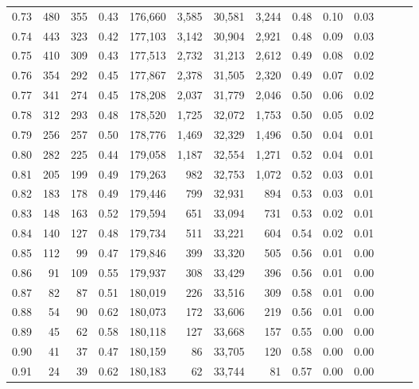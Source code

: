 \begin{tabular}{rrrrrrrrrrrrrr}
0.73 &    480 &    355 &  0.43 &  176,660 &    3,585 &  30,581 &   3,244 &  0.48 &  0.10 &      0.03 \\
0.74 &    443 &    323 &  0.42 &  177,103 &    3,142 &  30,904 &   2,921 &  0.48 &  0.09 &      0.03 \\
0.75 &    410 &    309 &  0.43 &  177,513 &    2,732 &  31,213 &   2,612 &  0.49 &  0.08 &      0.02 \\
0.76 &    354 &    292 &  0.45 &  177,867 &    2,378 &  31,505 &   2,320 &  0.49 &  0.07 &      0.02 \\
0.77 &    341 &    274 &  0.45 &  178,208 &    2,037 &  31,779 &   2,046 &  0.50 &  0.06 &      0.02 \\
0.78 &    312 &    293 &  0.48 &  178,520 &    1,725 &  32,072 &   1,753 &  0.50 &  0.05 &      0.02 \\
0.79 &    256 &    257 &  0.50 &  178,776 &    1,469 &  32,329 &   1,496 &  0.50 &  0.04 &      0.01 \\
0.80 &    282 &    225 &  0.44 &  179,058 &    1,187 &  32,554 &   1,271 &  0.52 &  0.04 &      0.01 \\
0.81 &    205 &    199 &  0.49 &  179,263 &      982 &  32,753 &   1,072 &  0.52 &  0.03 &      0.01 \\
0.82 &    183 &    178 &  0.49 &  179,446 &      799 &  32,931 &     894 &  0.53 &  0.03 &      0.01 \\
0.83 &    148 &    163 &  0.52 &  179,594 &      651 &  33,094 &     731 &  0.53 &  0.02 &      0.01 \\
0.84 &    140 &    127 &  0.48 &  179,734 &      511 &  33,221 &     604 &  0.54 &  0.02 &      0.01 \\
0.85 &    112 &     99 &  0.47 &  179,846 &      399 &  33,320 &     505 &  0.56 &  0.01 &      0.00 \\
0.86 &     91 &    109 &  0.55 &  179,937 &      308 &  33,429 &     396 &  0.56 &  0.01 &      0.00 \\
0.87 &     82 &     87 &  0.51 &  180,019 &      226 &  33,516 &     309 &  0.58 &  0.01 &      0.00 \\
0.88 &     54 &     90 &  0.62 &  180,073 &      172 &  33,606 &     219 &  0.56 &  0.01 &      0.00 \\
0.89 &     45 &     62 &  0.58 &  180,118 &      127 &  33,668 &     157 &  0.55 &  0.00 &      0.00 \\
0.90 &     41 &     37 &  0.47 &  180,159 &       86 &  33,705 &     120 &  0.58 &  0.00 &      0.00 \\
0.91 &     24 &     39 &  0.62 &  180,183 &       62 &  33,744 &      81 &  0.57 &  0.00 &      0.00 \\

\end{tabular}

